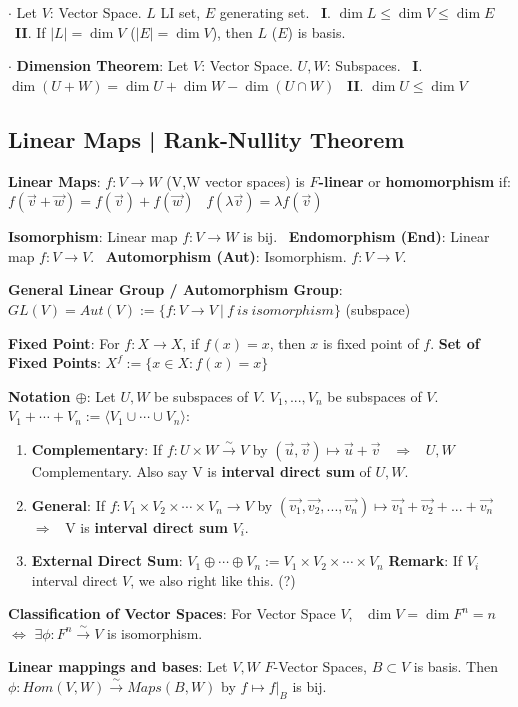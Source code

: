\documentclass[9pt]{article}
\newcommand{\bij}{\stackrel{\sim}{\rightarrow}}
\begin{document}
$\cdot$ Let $V$: Vector Space. $L$ LI set, $E$ generating set. \ \textbf{I}. $\dim L\leq \dim V\leq\dim E$ \ \textbf{II}. If $|L|=\dim V$ ($|E|=\dim V$), then $L$ ($E$) is basis.

$\cdot$ \textbf{Dimension Theorem}: Let $V$: Vector Space. $U,W$: Subspaces. \ \textbf{I}. $\dim(U+W)=\dim U+\dim W-\dim(U\cap W)$ \ \textbf{II}. $\dim U\leq\dim V$


\subsection{Linear Maps | Rank-Nullity Theorem}

\textbf{Linear Maps}: $f:V\to W$ {\small (V,W vector spaces) is \textbf{$F$-linear} or \textbf{homomorphism} if: \quad $f(\vec{v}+\vec{w})=f(\vec{v})+f(\vec{w})$ \ $f(\lambda\vec{v})=\lambda f(\vec{v})$ }

\textbf{Isomorphism}: {\small Linear map $f:V\to W$ is bij. \ \textbf{Endomorphism (End)}: Linear map $f:V\to V$. \ \textbf{Automorphism (Aut)}: Isomorphism. $f:V\to V$.}

\textbf{General Linear Group / Automorphism Group}: $GL(V)=Aut(V):=\{f:V\to V \ | \ f \ is \ isomorphism\}$ {\scriptsize (subspace)}

\textbf{Fixed Point}: For $f:X\to X$, if $f(x)=x$, then $x$ is fixed point of $f$. \quad \textbf{Set of Fixed Points}: $X^f:=\{x\in X:f(x)=x\}$

\textbf{Notation $\oplus$}: Let $U,W$ be subspaces of $V$. \quad $V_1,...,V_n$ be subspaces of $V$. \quad \quad $V_1+\cdots+V_n:=\langle V_1\cup\cdots\cup V_n\rangle$:

\begin{enumerate}[itemsep=-2pt, topsep=-2pt]
    \item \textbf{Complementary}: If $f:U\times W\bij V$ by $(\vec{u},\vec{v})\mapsto\vec{u}+\vec{v}$ \ $\Rightarrow$ \ $U,W$ Complementary. \quad Also say V is \textbf{interval direct sum}  of $U,W$.
    \item \textbf{General}: If $f:V_1\times V_2\times\cdots\times V_n\to V$ by $(\vec{v_1},\vec{v_2},...,\vec{v_n})\mapsto\vec{v_1}+\vec{v_2}+...+\vec{v_n}$ \ $\Rightarrow$ \ V is \textbf{interval direct sum} $V_i$.
    \item \textbf{External Direct Sum}: $V_1\oplus\cdots\oplus V_n:=V_1\times V_2\times\cdots\times V_n$ \quad \textbf{Remark}: If $V_i$ interval direct $V$, we also right like this. (?)
\end{enumerate}

\textbf{Classification of Vector Spaces}: For Vector Space $V$, \ $\dim V = \dim F^n=n$ $\Leftrightarrow$ $\exists\phi:F^n\bij V$ is isomorphism.

\textbf{Linear mappings and bases}: Let $V,W$ $F$-Vector Spaces, $B\subset V$ is basis. Then $\phi:Hom(V,W)\bij Maps(B,W)$ by $f\mapsto f|_B$ is bij.
\end{document}
